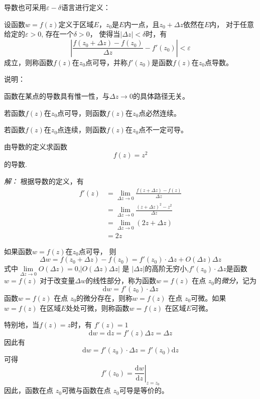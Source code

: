 导数也可采用$\varepsilon-\delta$语言进行定义：
\begin{definition}
  \label{}\index{}
  设函数$w = f(z)$定义于区域$E$，$z_0$是$E$内一点，且$z_0 + \Delta z$依然在$E$内，
  对于任意给定的$\varepsilon>0$, 存在一个$\delta>0$， 使得当$|\Delta z|< \delta$时，有
  \[\left|\frac{f(z_0 +  \Delta z) - f(z_0) }{\Delta z} - f'(z_0)\right| < \varepsilon\] 
  成立，则称函数$f(z)$在$z_0$点可导，并称$f'(z_0)$是函数$f(z)$在$z_0$点导数。
\end{definition}
说明：\begin{compactitem}
    \item 函数在某点的导数具有惟一性，与$\Delta z \to 0$的具体路径无关。
    \item 若函数$f(z)$在$z_0$点可导，则函数$f(z)$在$z_0$点必然连续。
    \item 若函数$f(z)$在$z_0$点连续，则函数$f(z)$在$z_0$点不一定可导。
\end{compactitem}

\begin{example}
  由导数的定义求函数
\[ f(z) = z^2\]
的导数.
\end{example}
\emph{解：} 根据导数的定义，有 
\[ \begin{aligned}
f'(z) &= \lim_{\Delta z \to 0 }  \frac{f(z +  \Delta z) - f(z)}{\Delta z} \\
&= \lim_{\Delta z \to 0 }  \frac{(z +  \Delta z)^2 - z^2}{\Delta z} \\
&=  \lim_{\Delta z \to 0 } (2z +  \Delta z) \\
&= 2z
\end{aligned}\]

\begin{definition}
      \label{}\index{}
      如果函数$w =f(z)$在$z_0$点可导， 则
      \[ \Delta w = f(z_0 + \Delta z) - f(z_0) =  f'(z_0)\cdot \Delta z + O(\Delta z)\Delta z
      \]
      式中$\lim\limits_{\Delta z \to 0} O(\Delta z) =0 $,$ \left\vert O(\Delta z)\Delta z\right\vert$ 是 $\left\vert \Delta z \right\vert$的高阶无穷小,$f'(z_0)\cdot \Delta z$是函数$w = f(z)$ 对于改变量$\Delta w$的线性部分，称为函数$w = f(z)$ 在点 $z_0$的\emph{微分}，记为
      \[ \mathrm{d}w = f'(z_0)\cdot \Delta z\]
      函数$w = f(z)$ 在点 $z_0$的微分存在，则称$w = f(z)$ 在点 $z_0$可微。如果$w = f(z)$ 在区域$E$处处可微，则称函数$w = f(z)$ 在区域$E$可微。 
  \end{definition}
  特别地，当$f(z) =z$时，有 $f'(z) =1$
  \[ \mathrm{d}w = \mathrm{d}z = f'(z)\Delta z = \Delta z \]
  因此有
  \[ \mathrm{d}w = f'(z_0)\cdot \Delta z = f'(z_0) \mathrm{d} z\]
  可得
  \[ f'(z_0) = \left.\frac{\mathrm{d} w }{\mathrm{d} z} \right|_{z=z_0} \]
  因此，函数在点 $z_0$可微与函数在点 $z_0$可导是等价的。
  
